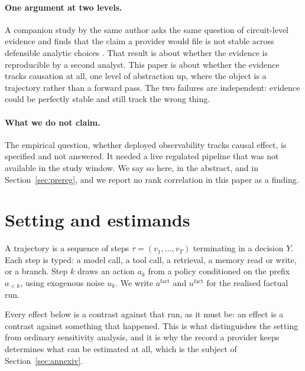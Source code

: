 \documentclass[11pt]{article}
\theoremstyle{remark}
\newif\ifanon
\begin{document}
\paragraph{One argument at two levels.} \ifanon Prior work asks\else A companion
study by the same author asks\fi{} the same question of circuit-level evidence and
finds that the claim a provider would file is not stable across defensible
analytic choices \citep{mahale2026multiplicity}. That result is about whether the evidence is
reproducible by a second analyst. This paper is about whether the evidence tracks
causation at all, one level of abstraction up, where the object is a trajectory
rather than a forward pass. The two failures are independent: evidence could be
perfectly stable and still track the wrong thing.

\paragraph{What we do not claim.} The empirical question, whether deployed
observability tracks causal effect, is specified and not answered. It needed a
live regulated pipeline that was not available in the study window. We say so
here, in the abstract, and in Section~\ref{sec:prereg}, and we report no rank
correlation in this paper as a finding.

\section{Setting and estimands}
\label{sec:setting}

A trajectory is a sequence of steps $\tau = (v_1,\dots,v_T)$ terminating in a
decision $Y$. Each step is typed: a model call, a tool call, a retrieval, a memory
read or write, or a branch. Step $k$ draws an action $a_k$ from a policy
conditioned on the prefix $a_{<k}$, using exogenous noise $u_k$. We write
$a^{\mathrm{fact}}$ and $u^{\mathrm{fact}}$ for the realised factual run.

Every effect below is a contrast against that run, as it must be: an effect is a
contrast against something that happened. This is what distinguishes the setting
from ordinary sensitivity analysis, and it is why the record a provider keeps
determines what can be estimated at all, which is the subject of
Section~\ref{sec:annexiv}.
\end{document}

